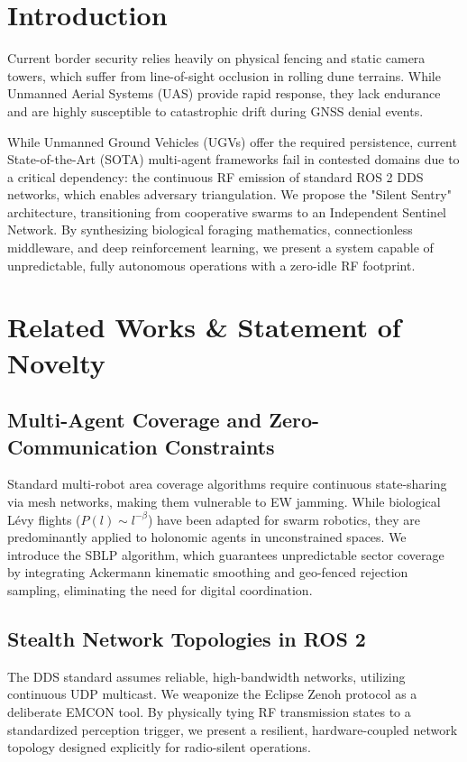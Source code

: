 \documentclass[conference]{IEEEtran}
\begin{document}
\section{Introduction}
Current border security relies heavily on physical fencing and static camera towers, which suffer from line-of-sight occlusion in rolling dune terrains. While Unmanned Aerial Systems (UAS) provide rapid response, they lack endurance and are highly susceptible to catastrophic drift during GNSS denial events. 

While Unmanned Ground Vehicles (UGVs) offer the required persistence, current State-of-the-Art (SOTA) multi-agent frameworks fail in contested domains due to a critical dependency: the continuous RF emission of standard ROS 2 DDS networks, which enables adversary triangulation. We propose the "Silent Sentry" architecture, transitioning from cooperative swarms to an Independent Sentinel Network. By synthesizing biological foraging mathematics, connectionless middleware, and deep reinforcement learning, we present a system capable of unpredictable, fully autonomous operations with a zero-idle RF footprint.

\section{Related Works \& Statement of Novelty}

\subsection{Multi-Agent Coverage and Zero-Communication Constraints}
Standard multi-robot area coverage algorithms require continuous state-sharing via mesh networks, making them vulnerable to EW jamming. While biological Lévy flights ($P(l) \sim l^{-\beta}$) have been adapted for swarm robotics, they are predominantly applied to holonomic agents in unconstrained spaces. We introduce the SBLP algorithm, which guarantees unpredictable sector coverage by integrating Ackermann kinematic smoothing and geo-fenced rejection sampling, eliminating the need for digital coordination.

\subsection{Stealth Network Topologies in ROS 2}
The DDS standard assumes reliable, high-bandwidth networks, utilizing continuous UDP multicast. We weaponize the Eclipse Zenoh protocol as a deliberate EMCON tool. By physically tying RF transmission states to a standardized perception trigger, we present a resilient, hardware-coupled network topology designed explicitly for radio-silent operations.
\end{document}
